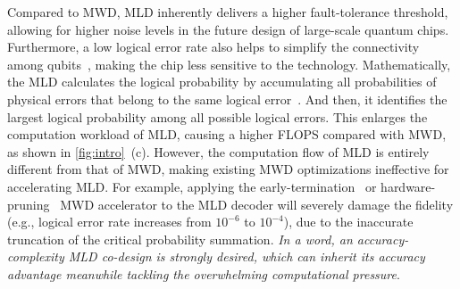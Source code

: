 





Compared to MWD, MLD inherently delivers a higher fault-tolerance threshold, allowing for higher noise levels in the future design of large-scale quantum chips. Furthermore, a low logical error rate also helps to simplify the connectivity among qubits~\cite{cao2025exact,chubb2021statistical}, making the chip less sensitive to the technology.
Mathematically, the MLD calculates the logical probability by accumulating all probabilities
of physical errors that belong to the same logical error~\cite{jung2020quantum}. And then, it identifies the largest logical probability among all possible logical errors. {This enlarges the computation workload of MLD, causing a higher FLOPS compared with MWD, as shown in }\autoref{fig:intro}~(c).
However, the computation flow of MLD is entirely different from that of MWD, making existing MWD optimizations ineffective for accelerating MLD. For example, applying the early-termination~\cite{das2022afs} or hardware-pruning~\cite{alavisamani2024promatch,zhou2025vegapunk} MWD accelerator to the MLD decoder will severely damage the fidelity (e.g., logical error rate increases from $10^{-6}$ to $10^{-4}$), due to the inaccurate truncation of the critical probability summation. \textit{In a word, an accuracy-complexity MLD co-design is strongly desired, which can inherit its accuracy advantage meanwhile tackling the overwhelming computational pressure}. 

